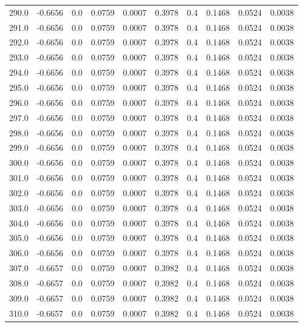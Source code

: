 \begin{longtable}{lrrrrrrrrr}
290.0 & -0.6656 & 0.0 & 0.0759 & 0.0007 & 0.3978 & 0.4 & 0.1468 & 0.0524 & 0.0038 \\
291.0 & -0.6656 & 0.0 & 0.0759 & 0.0007 & 0.3978 & 0.4 & 0.1468 & 0.0524 & 0.0038 \\
292.0 & -0.6656 & 0.0 & 0.0759 & 0.0007 & 0.3978 & 0.4 & 0.1468 & 0.0524 & 0.0038 \\
293.0 & -0.6656 & 0.0 & 0.0759 & 0.0007 & 0.3978 & 0.4 & 0.1468 & 0.0524 & 0.0038 \\
294.0 & -0.6656 & 0.0 & 0.0759 & 0.0007 & 0.3978 & 0.4 & 0.1468 & 0.0524 & 0.0038 \\
295.0 & -0.6656 & 0.0 & 0.0759 & 0.0007 & 0.3978 & 0.4 & 0.1468 & 0.0524 & 0.0038 \\
296.0 & -0.6656 & 0.0 & 0.0759 & 0.0007 & 0.3978 & 0.4 & 0.1468 & 0.0524 & 0.0038 \\
297.0 & -0.6656 & 0.0 & 0.0759 & 0.0007 & 0.3978 & 0.4 & 0.1468 & 0.0524 & 0.0038 \\
298.0 & -0.6656 & 0.0 & 0.0759 & 0.0007 & 0.3978 & 0.4 & 0.1468 & 0.0524 & 0.0038 \\
299.0 & -0.6656 & 0.0 & 0.0759 & 0.0007 & 0.3978 & 0.4 & 0.1468 & 0.0524 & 0.0038 \\
300.0 & -0.6656 & 0.0 & 0.0759 & 0.0007 & 0.3978 & 0.4 & 0.1468 & 0.0524 & 0.0038 \\
301.0 & -0.6656 & 0.0 & 0.0759 & 0.0007 & 0.3978 & 0.4 & 0.1468 & 0.0524 & 0.0038 \\
302.0 & -0.6656 & 0.0 & 0.0759 & 0.0007 & 0.3978 & 0.4 & 0.1468 & 0.0524 & 0.0038 \\
303.0 & -0.6656 & 0.0 & 0.0759 & 0.0007 & 0.3978 & 0.4 & 0.1468 & 0.0524 & 0.0038 \\
304.0 & -0.6656 & 0.0 & 0.0759 & 0.0007 & 0.3978 & 0.4 & 0.1468 & 0.0524 & 0.0038 \\
305.0 & -0.6656 & 0.0 & 0.0759 & 0.0007 & 0.3978 & 0.4 & 0.1468 & 0.0524 & 0.0038 \\
306.0 & -0.6656 & 0.0 & 0.0759 & 0.0007 & 0.3978 & 0.4 & 0.1468 & 0.0524 & 0.0038 \\
307.0 & -0.6657 & 0.0 & 0.0759 & 0.0007 & 0.3982 & 0.4 & 0.1468 & 0.0524 & 0.0038 \\
308.0 & -0.6657 & 0.0 & 0.0759 & 0.0007 & 0.3982 & 0.4 & 0.1468 & 0.0524 & 0.0038 \\
309.0 & -0.6657 & 0.0 & 0.0759 & 0.0007 & 0.3982 & 0.4 & 0.1468 & 0.0524 & 0.0038 \\
310.0 & -0.6657 & 0.0 & 0.0759 & 0.0007 & 0.3982 & 0.4 & 0.1468 & 0.0524 & 0.0038 \\

\end{longtable}
